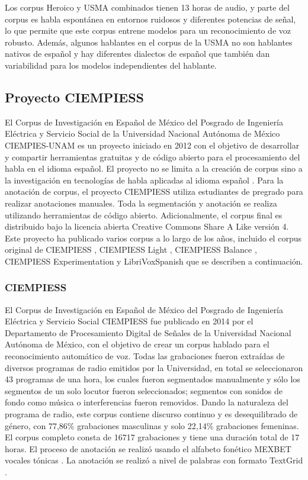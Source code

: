 Los corpus Heroico y USMA combinados tienen 13 horas de audio, y parte del corpus es habla espontánea en entornos ruidosos y diferentes potencias de señal, lo que permite que este corpus entrene modelos para un reconocimiento de voz robusto. Además, algunos hablantes en el corpus de la USMA no son hablantes nativos de español y hay diferentes dialectos de español que también dan variabilidad para los modelos independientes del hablante.

\subsection{Proyecto CIEMPIESS}

El Corpus de Investigación en Español de México del Posgrado de Ingeniería Eléctrica y Servicio Social de la Universidad Nacional Autónoma de México CIEMPIES-UNAM es un proyecto iniciado en 2012 con el objetivo de desarrollar y compartir herramientas gratuitas y de código abierto para el procesamiento del habla en el idioma español. El proyecto no se limita a la creación de corpus sino a la investigación en tecnologías de habla aplicadas al idioma español \cite{CIEMPIESS-Webpage}. Para la anotación de corpus, el proyecto CIEMPIESS utiliza estudiantes de pregrado para realizar anotaciones manuales. Toda la segmentación y anotación se realiza utilizando herramientas de código abierto. Adicionalmente, el corpus final es distribuido bajo la licencia abierta Creative Commons Share A Like versión 4. Este proyecto ha publicado varios corpus a lo largo de los años, incluido el corpus original de CIEMPIESS \cite {CIEMPIESS}, CIEMPIESS Light \cite {CIEMPIESS-LIGHT}, CIEMPIESS Balance \cite {CIEMPIESS-BALANCE}, CIEMPIESS Experimentation \cite {CIEMPIESS-Experimentation} y LibriVoxSpanish \cite {LibriVox-Spanish} que se describen a continuación.

\subsubsection{CIEMPIESS}

El Corpus de Investigación en Español de México del Posgrado de Ingeniería Eléctrica y Servicio Social CIEMPIESS \cite{CIEMPIESS} fue publicado en 2014 por el Departamento de Procesamiento Digital de Señales de la Universidad Nacional Autónoma de México, con el objetivo de crear un corpus hablado para el reconocimiento automático de voz. Todas las grabaciones fueron extraídas de diversos programas de radio emitidos por la Universidad, en total se seleccionaron 43 programas de una hora, los cuales fueron segmentados manualmente y sólo los segmentos de un solo locutor fueron seleccionados; segmentos con sonidos de fondo como música o interferencias fueron removidos. Dando la naturaleza del programa de radio, este corpus contiene discurso continuo y es desequilibrado de género, con 77,86\% grabaciones masculinas y solo 22,14\% grabaciones femeninas. El corpus completo consta de 16717 grabaciones y tiene una duración total de 17 horas. El proceso de anotación se realizó usando el alfabeto fonético MEXBET vocales tónicas \cite{mexbet}. La anotación se realizó a nivel de palabras con formato TextGrid \cite{TextGrids}.

